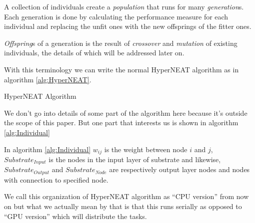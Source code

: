 \documentclass[twocolumn]{article}
\begin{document}
A collection of individuals create a \textit{population} that runs for many \textit{generation}s. Each generation is done by calculating the performance measure for each individual and replacing the unfit ones with the new offsprings of the fitter ones.

\textit{Offspring}s of a generation is the result of \textit{crossover} and \textit{mutation} of existing individuals, the details of which will be addressed later on.

With this terminology we can write the normal HyperNEAT algorithm as in algorithm \ref{alg:HyperNEAT}.

\begin{algorithm}
    \caption{HyperNEAT Algorithm}
    \label{alg:HyperNEAT}
    \begin{algorithmic}[1]
                    \EndFor
                \EndFor
            \EndFor
            \State {}
        \EndProcedure
    \end{algorithmic}
\end{algorithm}

We don't go into details of some part of the algorithm here because it's outside the scope of this paper. But one part that interests us is shown in algorithm \ref{alg:Individual}

In algorithm \ref{alg:Individual} $w_{ij}$ is the weight between node $i$ and $j$, $Substrate_{Input}$ is the nodes in the input layer of substrate and likewise, $Substrate_{Output}$ and $Substrate_{Node}$ are respectively output layer nodes and nodes with connection to specified node.

We call this organization of HyperNEAT algorithm as ``CPU version'' from now on but what we actually mean by that is that this runs serially as opposed to ``GPU version'' which will distribute the tasks.
\end{document}
